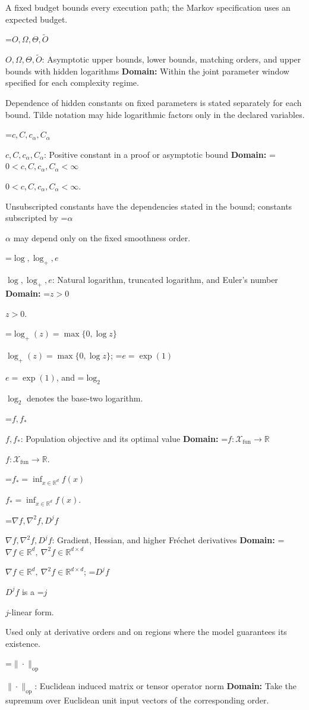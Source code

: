 \documentclass[10pt,a4paper]{article}
\newcommand{\AtlasMath}[1]{\par\begingroup\centering\setbox0=\hbox{$\displaystyle #1$}\ifdim\wd0>1.4\linewidth\typeout{ATLAS WIDE FORMULA: \the\wd0}\fi\ifdim\wd0>\linewidth\resizebox{\linewidth}{!}{\box0}\else\box0\fi\par\endgroup}
\newcommand{\AtlasInlineMath}[1]{\begingroup\setbox0=\hbox{$#1$}\ifdim\wd0>.4\linewidth\endgroup\AtlasMath{#1}\else\endgroup$#1$\fi}
\begin{document}
A fixed budget bounds every execution path; the Markov specification uses an expected budget.



\AtlasInlineMath{O,\Omega,\Theta,\widetilde{O}}: Asymptotic upper bounds, lower bounds, matching orders, and upper bounds with hidden logarithms \textbf{Domain:} Within the joint parameter window specified for each complexity regime.



Dependence of hidden constants on fixed parameters is stated separately for each bound. Tilde notation may hide logarithmic factors only in the declared variables.



\AtlasInlineMath{c,C,c_\alpha,C_\alpha}: Positive constant in a proof or asymptotic bound \textbf{Domain:} \AtlasInlineMath{0<c,C,c_\alpha,C_\alpha<\infty}.



Unsubscripted constants have the dependencies stated in the bound; constants subscripted by \AtlasInlineMath{\alpha} may depend only on the fixed smoothness order.



\AtlasInlineMath{\log,\log_+,e}: Natural logarithm, truncated logarithm, and Euler's number \textbf{Domain:} \AtlasInlineMath{z>0}.



\AtlasInlineMath{\log_+(z)=\max\{0,\log z\}}; \AtlasInlineMath{e=\exp(1)}, and \AtlasInlineMath{\log_2} denotes the base-two logarithm.



\AtlasInlineMath{f,f_*}: Population objective and its optimal value \textbf{Domain:} \AtlasInlineMath{f:\mathcal{X}_{\mathrm{fun}}\to\mathbb{R}}.



\AtlasInlineMath{f_*=\inf_{x\in \mathbb{R}^d}f(x)}.



\AtlasInlineMath{\nabla f,\nabla^2f,D^jf}: Gradient, Hessian, and higher Fréchet derivatives \textbf{Domain:} \AtlasInlineMath{\nabla f\in\mathbb{R}^d,\ \nabla^2f\in\mathbb{R}^{d\times d}}; \AtlasInlineMath{D^jf} is a \AtlasInlineMath{j}-linear form.



Used only at derivative orders and on regions where the model guarantees its existence.



\AtlasInlineMath{\|\cdot\|_{\mathrm{op}}}: Euclidean induced matrix or tensor operator norm \textbf{Domain:} Take the supremum over Euclidean unit input vectors of the corresponding order.
\end{document}
